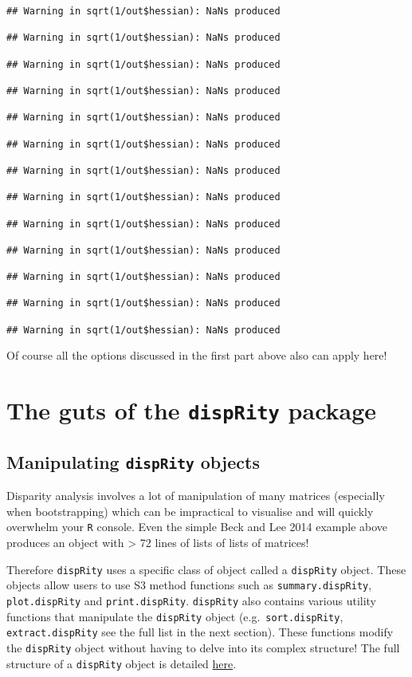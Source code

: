 \documentclass[
]{book}
\begin{document}
\begin{verbatim}
## Warning in sqrt(1/out$hessian): NaNs produced

## Warning in sqrt(1/out$hessian): NaNs produced

## Warning in sqrt(1/out$hessian): NaNs produced

## Warning in sqrt(1/out$hessian): NaNs produced

## Warning in sqrt(1/out$hessian): NaNs produced

## Warning in sqrt(1/out$hessian): NaNs produced

## Warning in sqrt(1/out$hessian): NaNs produced

## Warning in sqrt(1/out$hessian): NaNs produced

## Warning in sqrt(1/out$hessian): NaNs produced

## Warning in sqrt(1/out$hessian): NaNs produced

## Warning in sqrt(1/out$hessian): NaNs produced

## Warning in sqrt(1/out$hessian): NaNs produced

## Warning in sqrt(1/out$hessian): NaNs produced
\end{verbatim}

Of course all the options discussed in the first part above also can apply here!

\hypertarget{the-guts-of-the-disprity-package}{%
\chapter{\texorpdfstring{The guts of the \texttt{dispRity} package}{The guts of the dispRity package}}\label{the-guts-of-the-disprity-package}}

\hypertarget{manipulating-disprity-objects}{%
\section{\texorpdfstring{Manipulating \texttt{dispRity} objects}{Manipulating dispRity objects}}\label{manipulating-disprity-objects}}

Disparity analysis involves a lot of manipulation of many matrices (especially when bootstrapping) which can be impractical to visualise and will quickly overwhelm your \texttt{R} console.
Even the simple Beck and Lee 2014 example above produces an object with \textgreater{} 72 lines of lists of lists of matrices!

Therefore \texttt{dispRity} uses a specific class of object called a \texttt{dispRity} object.
These objects allow users to use S3 method functions such as \texttt{summary.dispRity}, \texttt{plot.dispRity} and \texttt{print.dispRity}.
\texttt{dispRity} also contains various utility functions that manipulate the \texttt{dispRity} object (e.g.~\texttt{sort.dispRity}, \texttt{extract.dispRity} see the full list in the next section).
These functions modify the \texttt{dispRity} object without having to delve into its complex structure!
The full structure of a \texttt{dispRity} object is detailed \href{https://github.com/TGuillerme/dispRity/blob/master/disparity_object.md}{here}.
\end{document}
